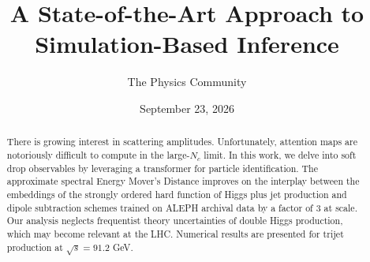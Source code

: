 \documentclass[11pt]{article}
\title{A State-of-the-Art Approach to Simulation-Based Inference}
\author{The Physics Community}
\date{September 23, 2026}
\numberwithin{equation}{section}
\theoremstyle{definition}
\theoremstyle{remark}
\begin{document}
\maketitle
\begin{abstract}
There is growing interest in scattering amplitudes. Unfortunately,
attention maps are notoriously difficult to compute in the large-$N_c$
limit. In this work, we delve into soft drop observables by leveraging a
transformer for particle identification. The approximate spectral Energy
Mover's Distance improves on the interplay between the embeddings of the
strongly ordered hard function of Higgs plus jet production and dipole
subtraction schemes trained on ALEPH archival data by a factor of 3 at
scale. Our analysis neglects frequentist theory uncertainties of double
Higgs production, which may become relevant at the LHC. Numerical
results are presented for trijet production at $\sqrt{s} = 91.2$ GeV.
\end{abstract}
\tableofcontents




\nocite{*}


\end{document}
